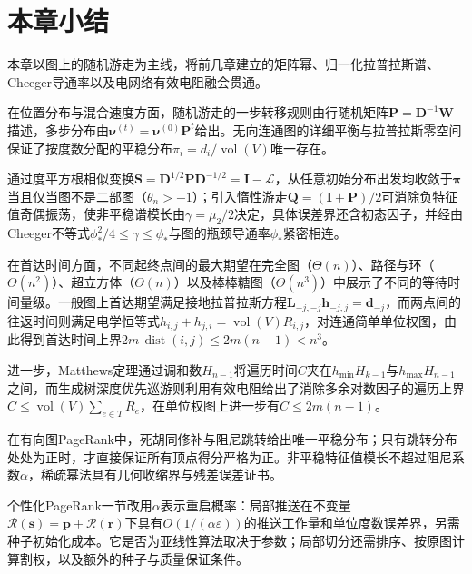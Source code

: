 \section{本章小结}
\label{sec:graph-walk-summary}

本章以图上的随机游走为主线，将前几章建立的矩阵幂、归一化拉普拉斯谱、Cheeger导通率以及电网络有效电阻融会贯通。

在位置分布与混合速度方面，随机游走的一步转移规则由行随机矩阵$\bm P=\bm D^{-1}\bm W$描述，多步分布由$\bm\nu^{(t)}=\bm\nu^{(0)}\bm P^t$给出。无向连通图的详细平衡与拉普拉斯零空间保证了按度数分配的平稳分布$\pi_i=d_i/\operatorname{vol}(V)$唯一存在。

通过度平方根相似变换$\bm S=\bm D^{1/2}\bm P\bm D^{-1/2}=\bm I-\mathcal L$，从任意初始分布出发均收敛于$\bm\pi$当且仅当图不是二部图（$\theta_n>-1$）；引入惰性游走$\bm Q=(\bm I+\bm P)/2$可消除负特征值奇偶振荡，使非平稳谱模长由$\gamma=\mu_2/2$决定，具体误差界还含初态因子，并经由Cheeger不等式$\phi_*^2/4\leq\gamma\leq\phi_*$与图的瓶颈导通率$\phi_*$紧密相连。

在首达时间方面，不同起终点间的最大期望在完全图（$\Theta(n)$）、路径与环（$\Theta(n^2)$）、超立方体（$\Theta(n)$）以及棒棒糖图（$\Theta(n^3)$）中展示了不同的等待时间量级。一般图上首达期望满足接地拉普拉斯方程$\bm L_{-j,-j}\bm h_{-j,j}=\bm d_{-j}$，而两点间的往返时间则满足电学恒等式$h_{i,j}+h_{j,i}=\operatorname{vol}(V)R_{i,j}$，对连通简单单位权图，由此得到首达时间上界$2m\,\operatorname{dist}(i,j)\leq 2m(n-1)<n^3$。

进一步，Matthews定理通过调和数$H_{n-1}$将遍历时间$C$夹在$h_{\min}H_{k-1}$与$h_{\max}H_{n-1}$之间，而生成树深度优先巡游则利用有效电阻给出了消除多余对数因子的遍历上界$C\leq\operatorname{vol}(V)\sum_{e\in T}R_e$，在单位权图上进一步有$C\leq2m(n-1)$。

在有向图PageRank中，死胡同修补与阻尼跳转给出唯一平稳分布；只有跳转分布处处为正时，才直接保证所有顶点得分严格为正。非平稳特征值模长不超过阻尼系数$\alpha$，稀疏幂法具有几何收缩界与残差误差证书。

个性化PageRank一节改用$\alpha$表示重启概率：局部推送在不变量$\mathcal R(\bm s)=\bm p+\mathcal R(\bm r)$下具有$O(1/(\alpha\varepsilon))$的推送工作量和单位度数误差界，另需种子初始化成本。它是否为亚线性算法取决于参数；局部切分还需排序、按原图计算割权，以及额外的种子与质量保证条件。
